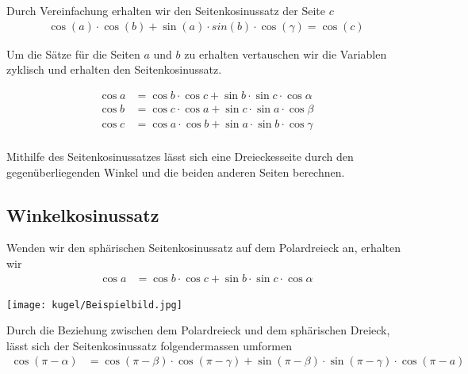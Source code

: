 \begin{refsection}
Durch Vereinfachung erhalten wir den Seitenkosinussatz der Seite $c$
\begin{align*}
\cos(a) \cdot \cos(b) + \sin(a) \cdot sin(b) \cdot \cos(\gamma) = \cos(c)
\end{align*}

Um die Sätze für die Seiten $a$ und $b$ zu erhalten vertauschen wir die Variablen zyklisch und erhalten den Seitenkosinussatz.

\begin{satz}
\label{skript:kugel:satz:Seitenkosinussatz}
\end{satz}

\begin{align*}
{\cos a} &= {\cos b} \cdot {\cos c} + {\sin b} \cdot {\sin c} \cdot {\cos \alpha}\\
{\cos b} &= {\cos c} \cdot {\cos a} + {\sin c} \cdot {\sin a} \cdot {\cos \beta}\\
{\cos c} &= {\cos a} \cdot {\cos b} + {\sin a} \cdot {\sin b} \cdot {\cos \gamma}\\
\end{align*}

Mithilfe des Seitenkosinussatzes lässt sich eine Dreieckesseite durch den gegenüberliegenden Winkel und die beiden anderen Seiten berechnen.



\subsection{Winkelkosinussatz}

Wenden wir den sphärischen Seitenkosinussatz auf dem Polardreieck an, erhalten wir
\begin{align*}
{\cos a} &= {\cos b} \cdot {\cos c} + {\sin b} \cdot {\sin c} \cdot {\cos \alpha}
\end{align*}

\begin{center}
        \texttt{[image: kugel/Beispielbild.jpg]}
\end{center}

Durch die Beziehung zwischen dem Polardreieck und dem sphärischen Dreieck, lässt sich der Seitenkosinussatz folgendermassen umformen
\begin{align*}
{\cos (\pi-\alpha)} &= {\cos (\pi-\beta)} \cdot {\cos (\pi-\gamma)} + {\sin(\pi-\beta)} \cdot {\sin(\pi-\gamma)} \cdot {\cos (\pi-a)}
\end{align*}


\end{refsection}
